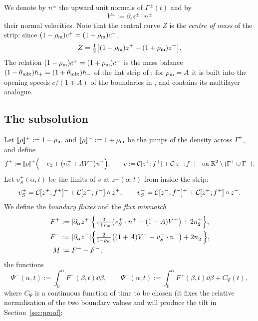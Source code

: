 We denote by $n^\pm$ the upward unit normals of $\Gamma^\pm(t)$ and by
\[
V^\pm:=\partial_tz^\pm\cdot n^\pm
\]
their normal velocities. Note that the central curve $Z$ is the \emph{centre of mass} of the strip: since $(1-\rho_{\mathrm m})c^+=(1+\rho_{\mathrm m})c^-$,
\begin{equation}\label{eq:com}
Z=\tfrac12\big[(1-\rho_{\mathrm m})z^++(1+\rho_{\mathrm m})z^-\big].
\end{equation}
The relation $(1-\rho_{\mathrm m})c^+=(1+\rho_{\mathrm m})c^-$ is the mass balance $(1-\theta_{\rm mix})h_+=(1+\theta_{\rm mix})h_-$ of the flat strip of \cite[Sec.~3.2]{LM26}; for $\rho_{\mathrm m}=A$
it is built into the opening speeds $c/(1\mp A)$ of the boundaries in \cite[(4.2)]{LM26}, and \cite[Sec.~7.5]{LM26} contains its multilayer analogue.

\subsection{The subsolution}
Let $[\![\rho]\!]^+:=1-\rho_{\mathrm m}$ and $[\![\rho]\!]^-:=1+\rho_{\mathrm m}$ be the jumps of the density across $\Gamma^\pm$, and define
\begin{equation}\label{eq:densities}
f^\pm:=[\![\rho]\!]^\pm\Big(-e_2+\big(n_2^\pm+AV^\pm\big)n^\pm\Big),\qquad v:=\mathcal{C}[z^+;f^+]+\mathcal{C}[z^-;f^-]\quad\text{on }\mathbb{R}^2\setminus(\Gamma^+\cup\Gamma^-).
\end{equation}
Let $v_S^\pm(\alpha,t)$ be the limits of $v$ at $z^\pm(\alpha,t)$ from inside the strip:
\begin{equation}\label{eq:vS}
v_S^+=\mathcal{C}[z^+;f^+]^-+\mathcal{C}[z^-;f^-]\circ z^+,\qquad v_S^-=\mathcal{C}[z^-;f^-]^++\mathcal{C}[z^+;f^+]\circ z^-.
\end{equation}
We define the \emph{boundary fluxes} and the \emph{flux mismatch}
\begin{align}
F^+&:=|\partial_\alpha z^+|\Big\{\tfrac{2}{1+\rho_{\mathrm m}}\big(v_S^+\cdot n^+-(1-A)V^+\big)+2n_2^+\Big\},\label{eq:Fplus}\\
F^-&:=|\partial_\alpha z^-|\Big\{\tfrac{2}{1-\rho_{\mathrm m}}\big((1+A)V^--v_S^-\cdot n^-\big)+2n_2^-\Big\},\label{eq:Fminus}\\
M&:=F^+-F^-,\label{eq:M}
\end{align}
the functions
\begin{equation}\label{eq:Psi-pm}
\Psi^-(\alpha,t):=\int_0^\alpha F^-(\beta,t)\dd\beta,\qquad \Psi^+(\alpha,t):=\int_0^\alpha F^+(\beta,t)\dd\beta+C_\Psi(t),
\end{equation}
where $C_\Psi$ is a continuous function of time to be chosen (it fixes the relative normalisation of the two boundary values and will produce the tilt in Section~\ref{sec:proof};

